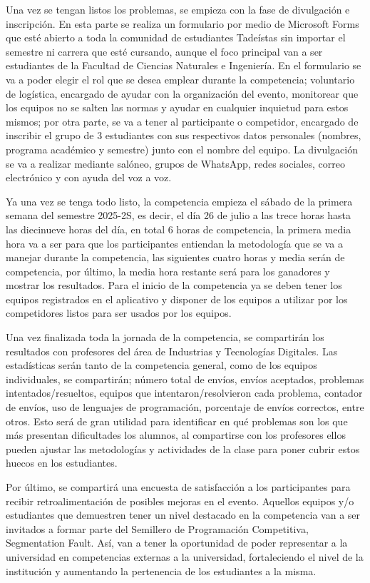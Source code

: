 \documentclass{article}
\begin{document}
Una vez se tengan listos los problemas, se empieza con la fase de divulgación e inscripción. En esta parte se realiza un formulario por medio de Microsoft Forms que esté abierto a toda la comunidad de estudiantes Tadeístas sin importar el semestre ni carrera que esté cursando, aunque el foco principal van a ser estudiantes de la Facultad de Ciencias Naturales e Ingeniería. En el formulario se va a poder elegir el rol que se desea emplear durante la competencia; voluntario de logística, encargado de ayudar con la organización del evento, monitorear que los equipos no se salten las normas y ayudar en cualquier inquietud para estos mismos; por otra parte, se va a tener al participante o competidor, encargado de inscribir el grupo de 3 estudiantes con sus respectivos datos personales (nombres, programa académico y semestre) junto con el nombre del equipo. La divulgación se va a realizar mediante salóneo, grupos de WhatsApp, redes sociales, correo electrónico y con ayuda del voz a voz.


Ya una vez se tenga todo listo, la competencia empieza el sábado de la primera semana del semestre 2025-2S, es decir, el día 26 de julio\cite{utadeo_calendario} a las trece horas hasta las diecinueve horas del día, en total 6 horas de competencia, la primera media hora va a ser para que los participantes entiendan la metodología que se va a manejar durante la competencia, las siguientes cuatro horas y media serán de competencia, por último, la media hora restante será para los ganadores y mostrar los resultados. Para el inicio de la competencia ya se deben tener los equipos registrados en el aplicativo y disponer de los equipos a utilizar por los competidores listos para ser usados por los equipos.


Una vez finalizada toda la jornada de la competencia, se compartirán los resultados con profesores del área de Industrias y Tecnologías Digitales. Las estadísticas serán tanto de la competencia general, como de los equipos individuales, se compartirán; número total de envíos, envíos aceptados, problemas intentados/resueltos, equipos que intentaron/resolvieron cada problema, contador de envíos, uso de lenguajes de programación, porcentaje de envíos correctos, entre otros. Esto será de gran utilidad para identificar en qué problemas son los que más presentan dificultades los alumnos, al compartirse con los profesores ellos pueden ajustar las metodologías y actividades de la clase para poner cubrir estos huecos en los estudiantes.


Por último, se compartirá una encuesta de satisfacción a los participantes para recibir retroalimentación de posibles mejoras en el evento. Aquellos equipos y/o estudiantes que demuestren tener un nivel destacado en la competencia van a ser invitados a formar parte del Semillero de Programación Competitiva, Segmentation Fault. Así, van a tener la oportunidad de poder representar a la universidad en competencias externas a la universidad, fortaleciendo el nivel de la institución y aumentando la pertenencia de los estudiantes a la misma.
\end{document}
